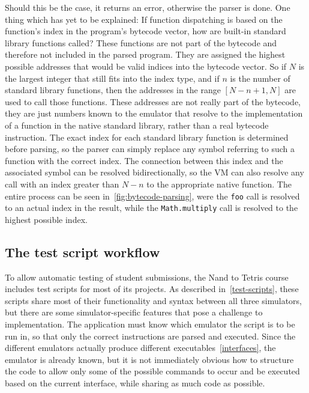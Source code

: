 Should this be the case, it returns an error, otherwise the parser is done.
One thing which has yet to be explained: If function dispatching is based on the function's index in the program's bytecode vector, how are built-in standard library functions called?
These functions are not part of the bytecode and therefore not included in the parsed program.
They are assigned the highest possible addresses that would be valid indices into the bytecode vector.
So if \(N\) is the largest integer that still fits into the index type, and if \(n\) is the number of standard library functions, then the addresses in the range \([N - n + 1, N]\) are used to call those functions.
These addresses are not really part of the bytecode, they are just numbers known to the emulator that resolve to the implementation of a function in the native standard library, rather than a real bytecode instruction.
The exact index for each standard library function is determined before parsing, so the parser can simply replace any symbol referring to such a function with the correct index.
The connection between this index and the associated symbol can be resolved bidirectionally, so the VM can also resolve any call with an index greater than \(N - n\) to the appropriate native function.
The entire process can be seen in~\cref{fig:bytecode-parsing}, were the \verb+foo+ call is resolved to an actual index in the result, while the \verb+Math.multiply+ call is resolved to the highest possible index.

\subsection{The test script workflow} \label{test-script-workflow}
To allow automatic testing of student submissions, the Nand to Tetris course includes test scripts for most of its projects.
As described in~\cref{test-scripts}, these scripts share most of their functionality and syntax between all three simulators, but there are some simulator-specific features that pose a challenge to implementation.
The application must know which emulator the script is to be run in, so that only the correct instructions are parsed and executed.
Since the different emulators actually produce different executables~\ref{interfaces}, the emulator is already known, but it is not immediately obvious how to structure the code to allow only some of the possible commands to occur and be executed based on the current interface, while sharing as much code as possible.

